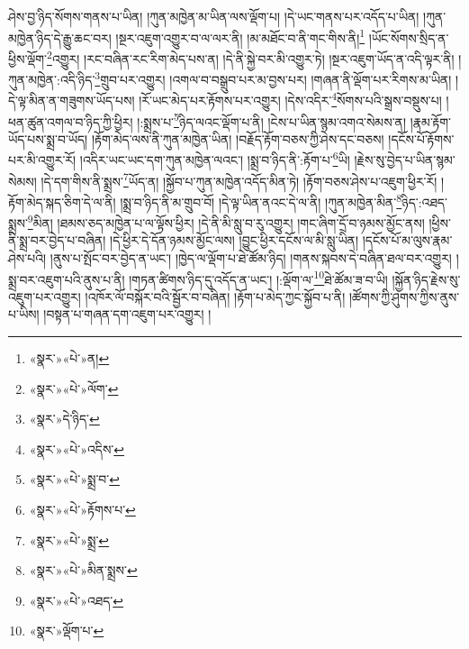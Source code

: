 ཤེས་བྱ་ཉིད་སོགས་གནས་པ་ཡིན། །ཀུན་མཁྱེན་མ་ཡིན་ལས་ལྡོག་པ། །དེ་ཡང་གནས་པར་འདོད་པ་ཡིན། །ཀུན་མཁྱེན་ཉིད་དེ་རྒྱུ་ཆང་བར། །སྔར་འཇུག་འགྱུར་བ་ལ་ལར་ནི། །མ་མཐོང་བ་ནི་གང་གིས་ནི།\footnote{«སྣར་»«པེ་»ན།} །ཡོང་སོགས་སྲིད་ན་ཕྱིས་ལྡོག་\footnote{«སྣར་»«པེ་»ལོག་}འགྱུར། །རང་བཞིན་རང་རིག་མེད་པས་ན། །དེ་ནི་སྐྱེ་བར་མི་འགྱུར་ཏེ། །སྔར་འཇུག་ཡོད་ན་འདི་ལྟར་ནི། །ཀུན་མཁྱེན་:འདི་ཉིད་\footnote{«སྣར་»དེ་ཉིད་}གྲུབ་པར་འགྱུར། །འགལ་བ་བསྒྲུབ་པར་མ་བྱས་པར། །གཞན་ནི་ལྡོག་པར་རིགས་མ་ཡིན། །དེ་ལྟ་མིན་ན་གཟུགས་ཡོད་པས། །རོ་ཡང་མེད་པར་རྟོགས་པར་འགྱུར། །དེས་འདིར་\footnote{«སྣར་»«པེ་»འདིས་}སོགས་པའི་སྒྲས་བསྡུས་པ། །ཕན་ཚུན་འགལ་བ་ཉིད་ཀྱི་ཕྱིར། །:སྨྲས་པ་\footnote{«སྣར་»«པེ་»སྨྲ་བ་}ཉིད་ལའང་ལྡོག་པ་ནི། །ངེས་པ་ཡིན་སྙམ་འགའ་སེམས་ན། །རྣམ་རྟོག་ཡོད་པས་སྨྲ་བ་ཡོད། །རྟོག་མེད་ལས་ནི་ཀུན་མཁྱེན་ཡིན། །བརྗོད་རྟོག་བཅས་ཀྱི་ཤེས་དང་བཅས། །དངོས་པོ་རྟོགས་པར་མི་འགྱུར་རོ། །འདིར་ཡང་ཡང་དག་ཀུན་མཁྱེན་ལའང་། །སྨྲ་བ་ཉིད་ནི་:རྟོག་པ་\footnote{«སྣར་»«པེ་»རྟོགས་པ་}ཡི། །རྗེས་སུ་བྱེད་པ་ཡིན་སྙམ་སེམས། །དེ་དག་གིས་ནི་སྨྲས་\footnote{«སྣར་»«པེ་»སྨྲ་}ཡོད་ན། །སྐྱོབ་པ་ཀུན་མཁྱེན་འདོད་མིན་ཏེ། །རྟོག་བཅས་ཤེས་པ་འཇུག་ཕྱིར་རོ། །རྟོག་མེད་སྐད་ཅིག་དེ་ལ་ནི། །སྨྲ་བ་ཉིད་ནི་མ་གྲུབ་བོ། །དེ་ལྟ་ཡིན་ནའང་དེ་ལ་ནི། །ཀུན་མཁྱེན་མིན་\footnote{«སྣར་»«པེ་»མིན་སྨྲས་}ཉིད་:འཐད་སྨྲས་\footnote{«སྣར་»«པེ་»འཐད་}མིན། །ཐམས་ཅད་མཁྱེན་པ་ལ་ལྟོས་ཕྱིར། །དེ་ནི་མི་སླུ་བ་རུ་འགྱུར། །གང་ཞིག་དྲོ་བ་ཉམས་མྱོང་ནས། །ཕྱིས་ནི་སྨྲ་བར་བྱེད་པ་བཞིན། །དེ་ཕྱིར་དེ་དོན་ཉམས་མྱོང་ལས། །བྱུང་ཕྱིར་དངོས་ལ་མི་སླུ་ཡིན། །དངོས་པོ་མ་ལུས་རྣམ་ཤེས་པའི། །ནུས་པ་སྤོང་བར་བྱེད་ན་ཡང་། །ཁྱེད་ལ་ལྡོག་པ་ཐེ་ཚོམ་ཉིད། །གནས་སྐབས་དེ་བཞིན་ཐལ་བར་འགྱུར། །སྨྲ་བར་འཇུག་པའི་ནུས་པ་ནི། །གཏན་ཚིགས་ཉིད་དུ་འདོད་ན་ཡང་། །:ལྡོག་ལ་\footnote{«སྣར་»ལྡོག་པ་}ཐེ་ཚོམ་ཟ་བ་ཡི། །སྐྱོན་ཉིད་རྗེས་སུ་འཇུག་པར་འགྱུར། །འཁོར་ལོ་བསྐོར་བའི་སྦྱོར་བ་བཞིན། །རྟོག་པ་མེད་ཀྱང་སྐྱོབ་པ་ནི། །ཚོགས་ཀྱི་ཤུགས་ཀྱིས་ནུས་པ་ཡིས། །བསྟན་པ་གཞན་དག་འཇུག་པར་འགྱུར། །
